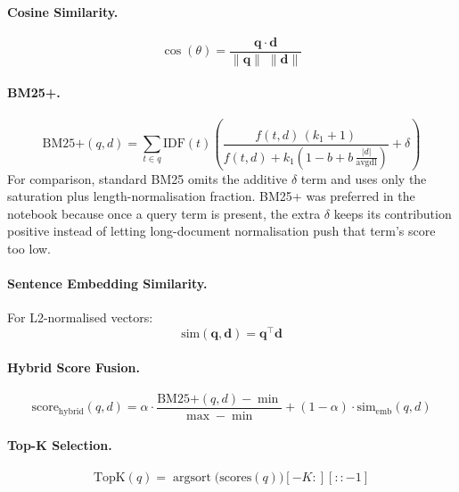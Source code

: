 \documentclass[11pt,a4paper]{article}
\begin{document}
\paragraph{Cosine Similarity.}
\[
\cos(\theta) = \frac{\mathbf{q} \cdot \mathbf{d}}
  {\lVert \mathbf{q} \rVert \; \lVert \mathbf{d} \rVert}
\]

\paragraph{BM25+.}
\[
\text{BM25+}(q,d) = \sum_{t \in q} \text{IDF}(t)
\left(
  \frac{f(t,d)\,(k_1+1)}
       {f(t,d) + k_1\!\left(1 - b + b\,\frac{|d|}{\text{avgdl}}\right)}
  + \delta
\right)
\]
For comparison, standard BM25 omits the additive $\delta$ term and uses only
the saturation plus length-normalisation fraction.  BM25+ was preferred in the
notebook because once a query term is present, the extra $\delta$ keeps its
contribution positive instead of letting long-document normalisation push that
term's score too low.

\paragraph{Sentence Embedding Similarity.}
For L2-normalised vectors:
\[
\text{sim}(\mathbf{q}, \mathbf{d}) = \mathbf{q}^\top \mathbf{d}
\]

\paragraph{Hybrid Score Fusion.}
\[
\text{score}_{\text{hybrid}}(q,d)
  = \alpha \cdot \frac{\text{BM25+}(q,d) - \min}{\max - \min}
  + (1-\alpha) \cdot \text{sim}_{\text{emb}}(q,d)
\]

\paragraph{Top-K Selection.}
\[
\text{TopK}(q) = \operatorname{argsort}\!\bigl(\text{scores}(q)\bigr)[-K:][::-1]
\]
\end{document}
